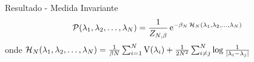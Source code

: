\begin{frame}
\begin{minipage}[h][0.47\textheight][c]{\textwidth}
{\begin{block}{Resultado - Medida Invariante}
\begin{equation*}
					\mathcal{P}{(\lambda_1, \lambda_2, \dots, \lambda_N)} = \frac{1}{Z_{N, \beta}} \operatorname{e}^{-\beta_N \operatorname{\mathcal{H}}_N(\lambda_1, \lambda_2, \dots, \lambda_N)}
			\end{equation*}
				onde
				$\operatorname{\mathcal{H}}_N(\lambda_1, \lambda_2, \dots, \lambda_N) = \frac{1}{\beta N} \sum_{i=1}^N \operatorname{V}(\lambda_i) + \frac{1}{2N^2} \sum_{i \neq j}^{N}  \log \frac{1}{|\lambda_i - \lambda_j|}$
		\end{block}
		}
	\end{minipage}
	
\end{frame}


